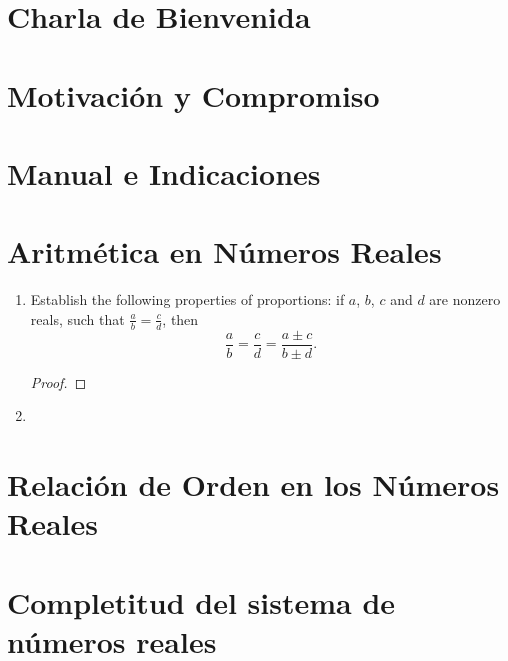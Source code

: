\section{Charla de Bienvenida}

\section{Motivaci\'{o}n y Compromiso}

\section{Manual e Indicaciones}

\section{Aritm\'{e}tica en N\'{u}meros Reales}
\begin{enumerate}
  \item Establish the following properties of proportions: if $a$, $b$, $c$ and $d$ are nonzero reals, such that $\frac{a}{b}= \frac{c}{d}$, then
  \begin{equation*}
    \frac{a}{b}= \frac{c}{d}= \frac{a\pm c}{b\pm d}.
  \end{equation*}
  \begin{proof}
  
  \end{proof}
  
  \item
\end{enumerate}

\section{Relaci\'{o}n de Orden en los N\'{u}meros Reales}

\section{Completitud del sistema de n\'{u}meros reales}
